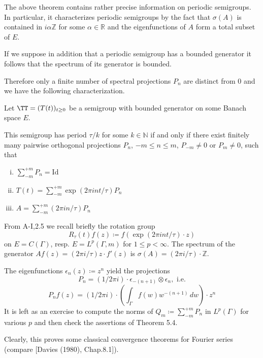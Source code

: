 The above theorem contains rather precise information on periodic semigroups.
In particular, it characterizes periodic semigroups by the fact that $\sigma(A)$ is contained in $i\alpha\mathbb{Z}$ for some $\alpha \in \mathbb{R}$ and the eigenfunctions of $A$ form a total subset of $E$.

If we suppose in addition that a periodic semigroup has a bounded generator it follows that the spectrum of its generator is bounded.



\newpage
Therefore only a finite number of spectral projections $P_{n}$ are distinct from $0$ and we have the following characterization.

\begin{corollary}\label{cor:a3-5.5}
	
	Let $\TT = (T(t))_{t \geq 0}$ be a semigroup with bounded generator on some Banach space $E$.
	
	This semigroup has period $\tau/k$ for some $k \in \mathbb{N}$ if and only if there exist finitely many pairwise orthogonal projections $P_{n}$, $-m \leq n \leq m$, $P_{-m} \neq 0$ or $P_{m} \neq 0$, such that
	\begin{enumerate}[(i)]
		\item $\sum_{-m}^{+m} P_{n} = \text{Id}$
		
		\item $T(t) = \sum_{-m}^{+m} \exp(2\pi int/\tau)P_{n}$
		
		\item $A = \sum_{-m}^{+m} (2\pi in/\tau)P_{n}$
	\end{enumerate}
\end{corollary}

\begin{example}\label{ex:a3-5.6}
	
	From A-I,2.5 we recall briefly the rotation group 
	\[
	R_{\tau}(t)f(z) \coloneqq f(\exp(2\pi int/\tau) \cdot z)
	\]
	on $E = C(\Gamma)$, resp. $E = L^{p}(\Gamma,m)$ for $1 \leq p < \infty$.	
	The spectrum of the generator\quad
	$Af(z) = (2\pi i/\tau)z \cdot f'(z)$\quad
	is \quad $\sigma(A) = (2\pi i/\tau)\cdot\mathbb{Z}$.
	
	The eigenfunctions $\epsilon_{n}(z) \coloneqq z^{n}$ yield the projections
	\[
	P_{n} = (1/2\pi i)\cdot\epsilon_{-(n+1)} \otimes \epsilon_{n}, \text{ i.e.}
	\]
	\[
	P_{n}f(z) = (1/2\pi i)\cdot(\int_{\Gamma} f(w)w^{-(n+1)} \, dw)\cdot z^{n}
	\]
	It is left as an exercise to compute the norms of $Q_{m} \coloneqq \sum_{-m}^{+m} P_{n}$ in $L^{p}(\Gamma)$ for various $p$ and then check the assertions of Theorem 5.4.
	
	Clearly, this proves some classical convergence theorems for Fourier series (compare [Davies (1980), Chap.8.1]).
\end{example}

